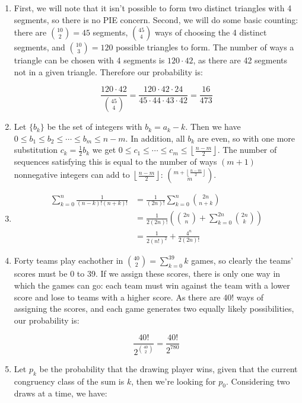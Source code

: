 \documentclass{book}
\numberwithin{equation}{section}
\begin{document}
\begin{enumerate}[label={9.\arabic*}]
\item
First, we will note that it isn't possible to form two distinct triangles with 4 segments, so there is no PIE concern.
Second, we will do some basic counting: there are ${10 \choose 2} = 45$ segments, ${45 \choose 4}$ ways of
choosing the 4 distinct segments, and ${10 \choose 3} = 120$ possible triangles to form. The number of ways
a triangle can be chosen with 4 segments is $120 \cdot 42$, as there are 42 segments not in a given triangle.
Therefore our probability is:

$$\frac{120 \cdot 42}{{45 \choose 4}} = \frac{120\cdot42\cdot24}{45\cdot44\cdot43\cdot42} = \frac{16}{473}$$

\item
Let $\{b_k\}$ be the set of integers with $b_k = a_k - k$. Then we have $0 \leq b_1 \leq b_2 \leq \cdots \leq b_m \leq n-m$.
In addition, all $b_k$ are even, so with one more substitution $c_k = \frac{1}{2}b_k$ we get
$0 \leq c_1 \leq \cdots \leq c_m \leq \left\lfloor \frac{n-m}{2} \right\rfloor$. The number of sequences satisfying this
is equal to the number of ways $(m+1)$ nonnegative integers can add to $\left\lfloor \frac{n-m}{2} \right\rfloor$:
${m + \left\lfloor \frac{n-m}{2} \right\rfloor \choose m}$.

\item
\begin{align*}
\sum_{k=0}^n \frac{1}{(n-k)!(n+k)!} & = \frac{1}{(2n)!}\sum_{k=0}^n {2n \choose n+k} \\
& = \frac{1}{2(2n)!}\left({2n \choose n} + \sum_{k=0}^{2n}{2n \choose k} \right) \\
& = \frac{1}{2(n!)^2} + \frac{4^n}{2(2n)!}
\end{align*}

\item
Forty teams play eachother in ${40 \choose 2} = \sum_{k=0}^{39} k$ games, so clearly the teams' scores must
be 0 to 39. If we assign these scores, there is only one way in which the games can go: each team must win against
the team with a lower score and lose to teams with a higher score. As there are 40! ways of assigning the scores,
and each game generates two equally likely possibilities, our probability is:

$$\frac{40!}{2^{{40 \choose 2}}} = \frac{40!}{2^{780}}$$

\item
Let $p_k$ be the probability that the drawing player wins, given that the current congruency class of the sum is $k$, then
we're looking for $p_0$. Considering two draws at a time, we have:


\end{enumerate}
\end{document}
